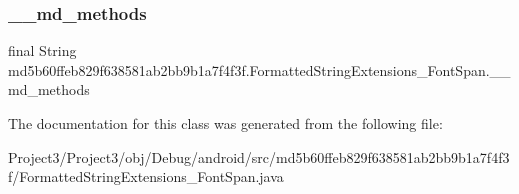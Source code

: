 \subsubsection{\texorpdfstring{\+\_\+\+\_\+md\+\_\+methods}{\_\_md\_methods}}
{\footnotesize\ttfamily final String md5b60ffeb829f638581ab2bb9b1a7f4f3f.\+Formatted\+String\+Extensions\+\_\+\+Font\+Span.\+\_\+\+\_\+md\+\_\+methods\hspace{0.3cm}{\ttfamily [static]}}



The documentation for this class was generated from the following file\+:\begin{DoxyCompactItemize}
\item 
Project3/\+Project3/obj/\+Debug/android/src/md5b60ffeb829f638581ab2bb9b1a7f4f3f/Formatted\+String\+Extensions\+\_\+\+Font\+Span.\+java\end{DoxyCompactItemize}
